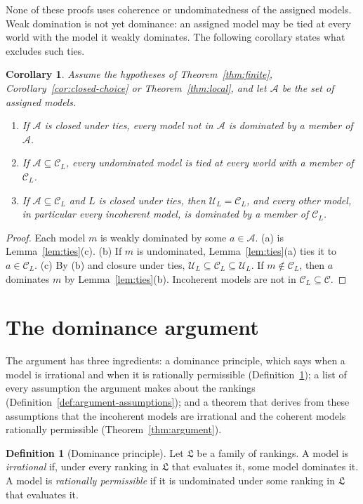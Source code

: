 \documentclass[11pt]{article}
\newtheorem{corollary}[theorem]{Corollary}
\theoremstyle{definition}
\newtheorem{definition}[theorem]{Definition}
\newcommand{\C}{\mathcal C}
\newcommand{\U}{\mathcal U}
\newcommand{\Lf}{\mathfrak L}
\begin{document}
None of these proofs uses coherence or undominatedness of the assigned models. Weak domination is not yet dominance: an assigned model may be tied at every world with the model it weakly dominates. The following corollary states what excludes such ties.

\begin{corollary}\label{cor:coherent-assigned}
Assume the hypotheses of Theorem~\ref{thm:finite}, Corollary~\ref{cor:closed-choice} or Theorem~\ref{thm:local}, and let $\mathcal A$ be the set of assigned models.
\begin{enumerate}[label=(\alph*)]
\item If $\mathcal A$ is closed under ties, every model not in $\mathcal A$ is dominated by a member of $\mathcal A$.
\item If $\mathcal A\subseteq\C_L$, every undominated model is tied at every world with a member of $\C_L$.
\item If $\mathcal A\subseteq\C_L$ and $L$ is closed under ties, then $\U_L=\C_L$, and every other model, in particular every incoherent model, is dominated by a member of $\C_L$.
\end{enumerate}
\end{corollary}
\begin{proof}
Each model $m$ is weakly dominated by some $a\in\mathcal A$. (a) is Lemma~\ref{lem:ties}(c). (b) If $m$ is undominated, Lemma~\ref{lem:ties}(a) ties it to $a\in\C_L$. (c) By (b) and closure under ties, $\U_L\subseteq\C_L\subseteq\U_L$. If $m\notin\C_L$, then $a$ dominates $m$ by Lemma~\ref{lem:ties}(b). Incoherent models are not in $\C_L\subseteq\C$.
\end{proof}

\section{The dominance argument}\label{sec:conclusion}

The argument has three ingredients: a dominance principle, which says when a model is irrational and when it is rationally permissible (Definition~\ref{def:permissibility}); a list of every assumption the argument makes about the rankings (Definition~\ref{def:argument-assumptions}); and a theorem that derives from these assumptions that the incoherent models are irrational and the coherent models rationally permissible (Theorem~\ref{thm:argument}).

\begin{definition}[Dominance principle]\label{def:permissibility}
Let $\Lf$ be a family of rankings. A model is \emph{irrational} if, under every ranking in $\Lf$ that evaluates it, some model dominates it. A model is \emph{rationally permissible} if it is undominated under some ranking in $\Lf$ that evaluates it.
\end{definition}
\end{document}
